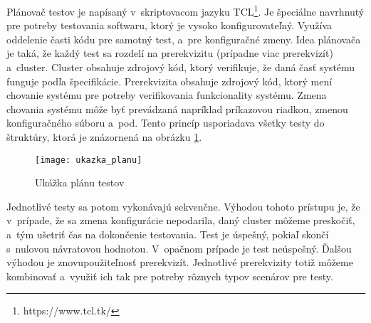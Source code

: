 Plánovač testov je napísaný v~skriptovacom jazyku TCL\footnote{https://www.tcl.tk/}. 
Je špeciálne navrhnutý pre potreby testovania softwaru, ktorý je vysoko konfigurovateľný. 
Využíva oddelenie časti kódu pre samotný test, a~pre konfiguračné zmeny. 
Idea plánovača je taká, že každý test sa rozdelí na prerekvizitu (prípadne viac prerekvizít) a~cluster. Cluster obsahuje zdrojový kód, ktorý verifikuje, že daná
časť systému funguje podľa špecifikácie. Prerekvizita obsahuje zdrojový kód, ktorý mení chovanie systému pre potreby verifikovania funkcionality systému.
Zmena chovania systému môže byť prevádzaná napríklad príkazovou riadkou, zmenou konfiguračného súboru a~pod.
Tento princíp usporiadava všetky testy do štruktúry, ktorá je znázornená na obrázku \ref{figure:ukazka_planu}.
\begin{figure}[h]
    \begin{center}
    \texttt{[image: ukazka\_planu]}
    \caption{Ukážka plánu testov}
    \label{figure:ukazka_planu}
    \end{center}
\end{figure}

Jednotlivé testy sa potom vykonávajú sekvenčne. Výhodou tohoto prístupu je, že v~prípade, že sa zmena konfigurácie nepodarila,
daný cluster môžeme preskočiť, a~tým ušetriť čas na dokončenie testovania. 
Test je úspešný, pokiaľ skončí s~nulovou návratovou hodnotou. V~opačnom prípade je test neúspešný. 
Ďalšou výhodou je znovupoužiteľnosť prerekvizít. 
Jednotlivé prerekvizity totiž môžeme kombinovať a~využiť ich tak pre potreby rôznych typov scenárov pre testy. 

